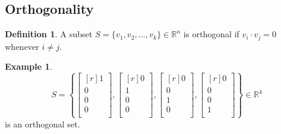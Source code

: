 \documentclass{report}
\theoremstyle{plain}
\theoremstyle{definition}
\newtheorem*{ex}{Example}
\newtheorem*{defn}{Definition}
\theoremstyle{plain}
\begin{document}
\subsection{Orthogonality}
\begin{defn}
A subset $S=\{v_1,v_2,...,v_k\}\in \mathbb{R}^n$ is orthogonal if $v_i \cdot v_j = 0$ whenever $i \neq j$.
\end{defn}
\begin{ex}
\[ S=\left \{ \begin{bmatrix}[r]1\\0\\0\\0\\\end{bmatrix},\begin{bmatrix}[r]0\\1\\0\\0\\\end{bmatrix},\begin{bmatrix}[r]0\\0\\1\\0\\\end{bmatrix},\begin{bmatrix}[r]0\\0\\0\\1\\\end{bmatrix}\right\}\in \mathbb{R}^4 \]
is an orthogonal set.
\end{ex}
\end{document}
